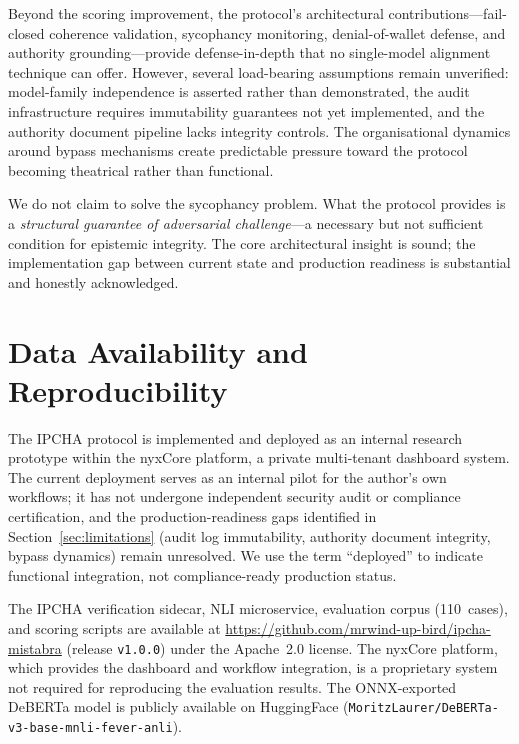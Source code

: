\documentclass[11pt,a4paper]{article}
\begin{document}
Beyond the scoring improvement, the protocol's architectural
contributions---fail-closed coherence validation, sycophancy
monitoring, denial-of-wallet defense, and authority
grounding---provide defense-in-depth that no single-model alignment
technique can offer.  However, several load-bearing assumptions
remain unverified: model-family independence is asserted rather than
demonstrated, the audit infrastructure requires immutability
guarantees not yet implemented, and the authority document pipeline
lacks integrity controls.  The organisational dynamics around bypass
mechanisms create predictable pressure toward the protocol becoming
theatrical rather than functional.

We do not claim to solve the sycophancy problem.  What the protocol
provides is a \emph{structural guarantee of adversarial
challenge}---a necessary but not sufficient condition for epistemic
integrity.  The core architectural insight is sound; the
implementation gap between current state and production readiness is
substantial and honestly acknowledged.

\section*{Data Availability and Reproducibility}

The IPCHA protocol is implemented and deployed as an internal
research prototype within the nyxCore platform, a private multi-tenant
dashboard system.  The current deployment serves as an internal pilot
for the author's own workflows; it has not undergone independent
security audit or compliance certification, and the production-readiness
gaps identified in Section~\ref{sec:limitations} (audit log
immutability, authority document integrity, bypass dynamics) remain
unresolved.  We use the term ``deployed'' to indicate functional
integration, not compliance-ready production status.

The IPCHA verification sidecar, NLI microservice, evaluation corpus
(110~cases), and scoring scripts are available at
\url{https://github.com/mrwind-up-bird/ipcha-mistabra} (release
\texttt{v1.0.0}) under the Apache~2.0 license.  The nyxCore platform, which provides the
dashboard and workflow integration, is a proprietary system not
required for reproducing the evaluation results.  The ONNX-exported
DeBERTa model is publicly available on HuggingFace
(\texttt{MoritzLaurer/DeBERTa-v3-base-mnli-fever-anli}).



\end{document}
